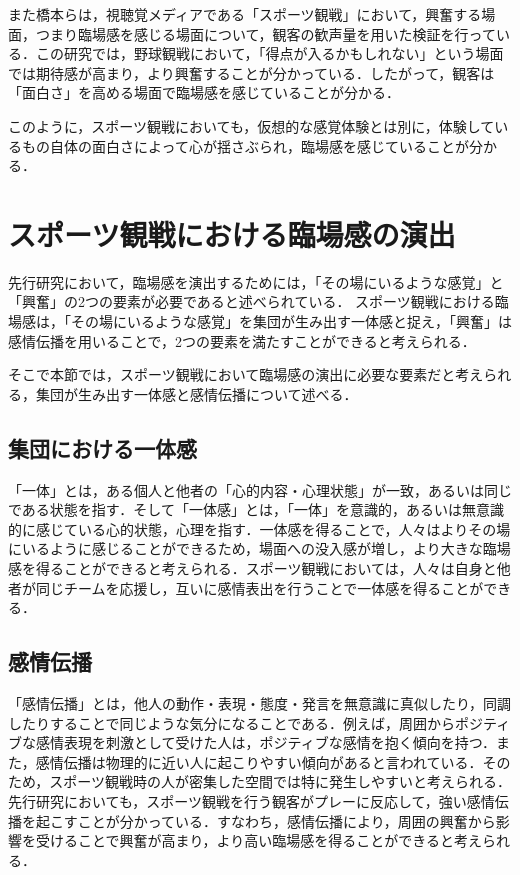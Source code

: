 また橋本らは，視聴覚メディアである「スポーツ観戦」において，興奮する場面，つまり臨場感を感じる場面について，観客の歓声量を用いた検証を行っている\cite{rinjyo3}．この研究では，野球観戦において，「得点が入るかもしれない」という場面では期待感が高まり，より興奮することが分かっている．したがって，観客は「面白さ」を高める場面で臨場感を感じていることが分かる．

このように，スポーツ観戦においても，仮想的な感覚体験とは別に，体験しているもの自体の面白さによって心が揺さぶられ，臨場感を感じていることが分かる．

\newpage

\section{スポーツ観戦における臨場感の演出}
\label{sec2.2}

先行研究において，臨場感を演出するためには，「その場にいるような感覚」と「興奮」の2つの要素が必要であると述べられている．
スポーツ観戦における臨場感は，「その場にいるような感覚」を集団が生み出す一体感と捉え，「興奮」は感情伝播を用いることで，2つの要素を満たすことができると考えられる．

そこで本節では，スポーツ観戦において臨場感の演出に必要な要素だと考えられる，集団が生み出す一体感と感情伝播について述べる．

\subsection{集団における一体感}
\label{sec2.2.1}

「一体」とは，ある個人と他者の「心的内容・心理状態」が一致，あるいは同じである状態を指す．そして「一体感」とは，「一体」を意識的，あるいは無意識的に感じている心的状態，心理を指す\cite{ittai}．一体感を得ることで，人々はよりその場にいるように感じることができるため，場面への没入感が増し，より大きな臨場感を得ることができると考えられる．スポーツ観戦においては，人々は自身と他者が同じチームを応援し，互いに感情表出を行うことで一体感を得ることができる．
    
\subsection{感情伝播}
\label{sec2.2.2}

「感情伝播」とは，他人の動作・表現・態度・発言を無意識に真似したり，同調したりすることで同じような気分になることである\cite{denpa}．例えば，周囲からポジティブな感情表現を刺激として受けた人は，ポジティブな感情を抱く傾向を持つ．また，感情伝播は物理的に近い人に起こりやすい傾向があると言われている．そのため，スポーツ観戦時の人が密集した空間では特に発生しやすいと考えられる．先行研究においても，スポーツ観戦を行う観客がプレーに反応して，強い感情伝播を起こすことが分かっている\cite{jyodo}．すなわち，感情伝播により，周囲の興奮から影響を受けることで興奮が高まり，より高い臨場感を得ることができると考えられる．

